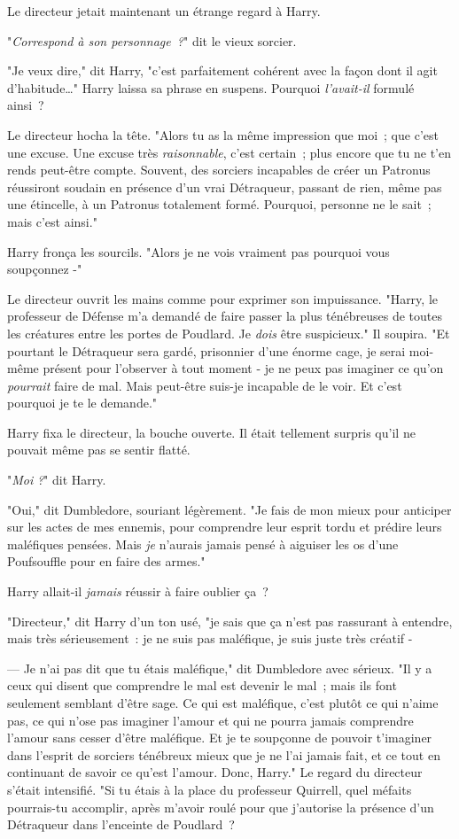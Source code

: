 Le directeur jetait maintenant un étrange regard à Harry.

"\emph{Correspond à son personnage~?}" dit le vieux sorcier.

"Je veux dire," dit Harry, "c'est parfaitement cohérent avec la façon dont il agit d'habitude…" Harry laissa sa phrase en suspens. Pourquoi \emph{l'avait-il} formulé ainsi~?

Le directeur hocha la tête. "Alors tu as la même impression que moi~; que c'est une excuse. Une excuse très \emph{raisonnable}, c'est certain~; plus encore que tu ne t'en rends peut-être compte. Souvent, des sorciers incapables de créer un Patronus réussiront soudain en présence d'un vrai Détraqueur, passant de rien, même pas une étincelle, à un Patronus totalement formé. Pourquoi, personne ne le sait~; mais c'est ainsi."

Harry fronça les sourcils. "Alors je ne vois vraiment pas pourquoi vous soupçonnez -"

Le directeur ouvrit les mains comme pour exprimer son impuissance. "Harry, le professeur de Défense m'a demandé de faire passer la plus ténébreuses de toutes les créatures entre les portes de Poudlard. Je \emph{dois} être suspicieux." Il soupira. "Et pourtant le Détraqueur sera gardé, prisonnier d'une énorme cage, je serai moi-même présent pour l'observer à tout moment - je ne peux pas imaginer ce qu'on \emph{pourrait} faire de mal. Mais peut-être suis-je incapable de le voir. Et c'est pourquoi je te le demande."

Harry fixa le directeur, la bouche ouverte. Il était tellement surpris qu'il ne pouvait même pas se sentir flatté.

"\emph{Moi} \emph{?}" dit Harry.

"Oui," dit Dumbledore, souriant légèrement. "Je fais de mon mieux pour anticiper sur les actes de mes ennemis, pour comprendre leur esprit tordu et prédire leurs maléfiques pensées. Mais \emph{je} n'aurais jamais pensé à aiguiser les os d'une Poufsouffle pour en faire des armes."

Harry allait-il \emph{jamais} réussir à faire oublier ça~?

"Directeur," dit Harry d'un ton usé, "je sais que ça n'est pas rassurant à entendre, mais très sérieusement~: je ne suis pas maléfique, je suis juste très créatif -

--- Je n'ai pas dit que tu étais maléfique," dit Dumbledore avec sérieux. "Il y a ceux qui disent que comprendre le mal est devenir le mal~; mais ils font seulement semblant d'être sage. Ce qui est maléfique, c'est plutôt ce qui n'aime pas, ce qui n'ose pas imaginer l'amour et qui ne pourra jamais comprendre l'amour sans cesser d'être maléfique. Et je te soupçonne de pouvoir t'imaginer dans l'esprit de sorciers ténébreux mieux que je ne l'ai jamais fait, et ce tout en continuant de savoir ce qu'est l'amour. Donc, Harry." Le regard du directeur s'était intensifié. "Si tu étais à la place du professeur Quirrell, quel méfaits pourrais-tu accomplir, après m'avoir roulé pour que j'autorise la présence d'un Détraqueur dans l'enceinte de Poudlard~?

